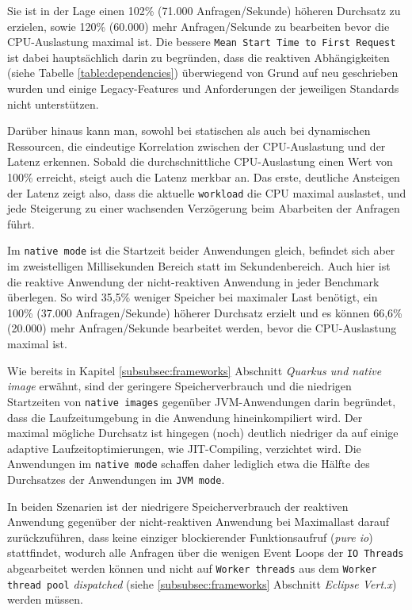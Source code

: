 Sie ist in der Lage einen 102\% (71.000 Anfragen/Sekunde) höheren Durchsatz zu erzielen,
sowie 120\% (60.000) mehr Anfragen/Sekunde zu bearbeiten bevor die CPU-Auslastung maximal ist.
Die bessere \verb|Mean Start Time to First Request| ist dabei hauptsächlich darin zu begründen, dass die reaktiven
Abhängigkeiten (siehe Tabelle \ref{table:dependencies})
überwiegend von Grund auf neu geschrieben wurden und einige Legacy-Features und Anforderungen der jeweiligen
Standards nicht unterstützen.

Darüber hinaus kann man, sowohl bei statischen als auch bei dynamischen Ressourcen, die eindeutige Korrelation zwischen der
CPU-Auslastung und der Latenz erkennen.
Sobald die durchschnittliche CPU-Auslastung einen Wert von 100\% erreicht, steigt auch die Latenz merkbar an.
Das erste, deutliche Ansteigen der Latenz zeigt also, dass die aktuelle \verb|workload| die CPU maximal auslastet,
und jede Steigerung zu einer wachsenden Verzögerung beim Abarbeiten der Anfragen führt.

Im \verb|native mode| ist die Startzeit beider Anwendungen gleich, befindet sich aber im zweistelligen Millisekunden Bereich statt
im Sekundenbereich.
Auch hier ist die reaktive Anwendung der nicht-reaktiven Anwendung in jeder Benchmark überlegen. So wird 35,5\% weniger Speicher bei maximaler Last
benötigt, ein 100\% (37.000 Anfragen/Sekunde) höherer  Durchsatz erzielt und es können 66,6\% (20.000) mehr Anfragen/Sekunde bearbeitet
werden, bevor die CPU-Auslastung maximal ist.

Wie bereits in Kapitel \ref{subsubsec:frameworks} Abschnitt \textit{Quarkus und native image} erwähnt, sind der geringere Speicherverbrauch und
die niedrigen Startzeiten von \verb|native images| gegenüber JVM-Anwendungen darin begründet, dass die Laufzeitumgebung in die
Anwendung hineinkompiliert wird. Der maximal mögliche Durchsatz ist hingegen (noch) deutlich niedriger da auf einige adaptive
Laufzeitoptimierungen, wie JIT-Compiling, verzichtet wird. Die Anwendungen im \verb|native mode| schaffen daher lediglich
etwa die Hälfte des Durchsatzes der Anwendungen im \verb|JVM mode|.

In beiden Szenarien ist der niedrigere Speicherverbrauch der reaktiven Anwendung gegenüber der nicht-reaktiven Anwendung
bei Maximallast darauf zurückzuführen, dass
keine einziger blockierender Funktionsaufruf (\textit{pure io}) stattfindet, wodurch alle Anfragen über die wenigen
Event Loops der \verb|IO Threads| abgearbeitet werden können und nicht auf \verb|Worker threads| aus dem \verb|Worker thread pool|
\textit{dispatched} (siehe \ref{subsubsec:frameworks} Abschnitt \textit{Eclipse Vert.x}) werden müssen.


